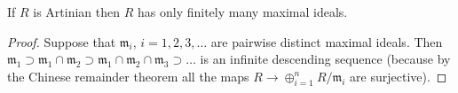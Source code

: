 \begin{lemma}
\label{lemma-artinian-finite-nr-max}
If $R$ is Artinian then $R$ has only finitely many maximal ideals.
\end{lemma}

\begin{proof}
Suppose that $\mathfrak m_i$, $i = 1, 2, 3, \ldots$ are
pairwise distinct maximal ideals.
Then $\mathfrak m_1 \supset \mathfrak m_1\cap \mathfrak m_2
\supset \mathfrak m_1 \cap \mathfrak m_2 \cap \mathfrak m_3 \supset \ldots$
is an infinite descending sequence (because by the Chinese
remainder theorem all the maps $R \to \oplus_{i = 1}^n R/\mathfrak m_i$
are surjective).
\end{proof}